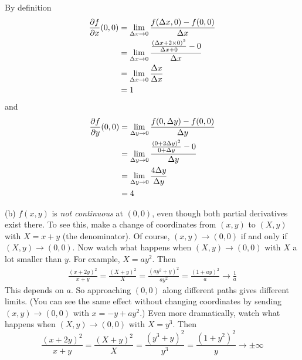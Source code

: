 \begin{solution}
By definition
\begin{align*}
\pdiff{f}{x}(0,0)
&=\lim_{\De x\rightarrow 0}\frac{f(\De x,0)-f(0,0)}{\De x} \\
&=\lim_{\De x\rightarrow 0}\frac{\frac{(\De x+2\times 0)^2}{\De x+0}-0}{\De x}   \\
&=\lim_{\De x\rightarrow 0}\frac{\De x}{\De x} \\
&=1
\end{align*}
and
\begin{align*}
\pdiff{f}{y}(0,0)
&=\lim_{\De y\rightarrow 0}\frac{f(0,\De y)-f(0,0)}{\De y} \\
&=\lim_{\De y\rightarrow 0}\frac{\frac{(0+2\De y)^2}{0+\De y}-0}{\De y} \\
&=\lim_{\De y\rightarrow 0}\frac{4\De y}{\De y} \\
&=4
\end{align*}

(b) $f(x,y)$ is \emph{not continuous} at $(0,0)$, even though both partial
derivatives exist there. To see this, make a change of coordinates from
$(x,y)$ to $(X,y)$ with $X=x+y$ (the denominator). Of course,
$(x,y)\rightarrow (0,0)$ if and only if $(X,y)\rightarrow (0,0)$.
Now watch what happens when $(X,y)\rightarrow(0,0)$ with $X$ a lot smaller
than $y$. For example, $X=ay^2$. Then
\begin{align*}
\frac{(x+2y)^2}{x+y}=\frac{(X+y)^2}{X}=\frac{(ay^2+y)^2}{ay^2}
=\frac{(1+ay)^2}{a}\rightarrow\frac{1}{a}
\end{align*}
This depends on $a$. So approaching $(0,0)$ along different paths gives
different limits. (You can see the same effect without changing coordinates
by sending $(x,y)\rightarrow (0,0)$ with $x=-y+ay^2$.) Even more dramatically,
watch what happens when $(X,y)\rightarrow(0,0)$ with  $X=y^3$. Then
\begin{equation*}
\frac{(x+2y)^2}{x+y}=\frac{(X+y)^2}{X}=\frac{(y^3+y)^2}{y^3}
=\frac{{(1+y^2)}^2}{y}\rightarrow\pm\infty
\end{equation*}

\end{solution}

